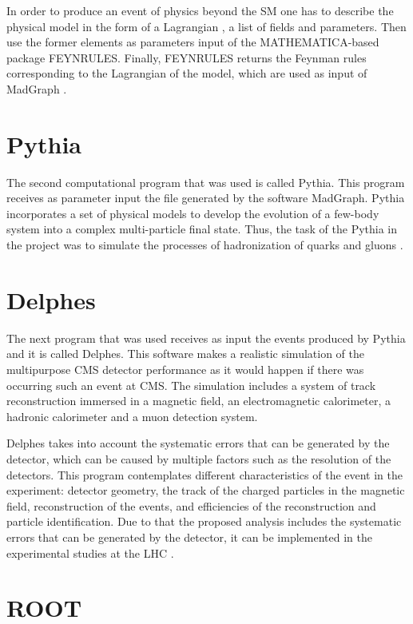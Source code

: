 In order to produce an event of physics beyond the SM one has to describe the physical model in the form of a Lagrangian , a list of fields and parameters. Then use the former elements as parameters
input of the MATHEMATICA-based package FEYNRULES. Finally, FEYNRULES returns the Feynman rules corresponding to the Lagrangian of the model, which are used as input of MadGraph \cite{MadGraph 2}.


\section{Pythia}

The second computational program that was used is called Pythia. This program receives as parameter input the file generated by the software MadGraph. Pythia incorporates a set of physical models 
to develop the evolution of a few-body system into a complex multi-particle final state. Thus, the task of the Pythia in the project was to simulate the processes of hadronization of quarks and 
gluons \cite{Pythia}.


\section{Delphes}

The next program that was used receives as input the events produced by Pythia and it is called Delphes. This software makes a realistic simulation of the multipurpose CMS detector performance as 
it would happen if there was occurring such an event at CMS. The simulation includes a system of track reconstruction immersed in a magnetic field, an electromagnetic calorimeter, a hadronic 
calorimeter and a muon detection system.

Delphes takes into account the systematic errors that can be generated by the detector, which can be caused by multiple factors such as the resolution of the detectors. This program contemplates
different characteristics of the event in the experiment: detector geometry, the track of the charged particles in the magnetic field, reconstruction of the events, and efficiencies of the
reconstruction and particle identification. Due to that the proposed analysis includes the systematic errors that can be generated by the detector, it can be implemented in the experimental studies
at the LHC \cite{Delphes}. 

\section{ROOT}

